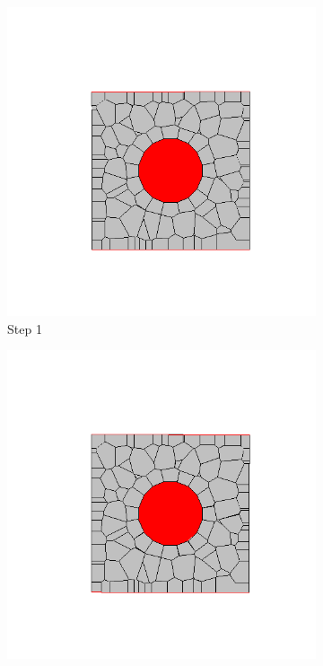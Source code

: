   \begin{figure}[ht!]
  \centering
      \begin{subfigure}{.25\textwidth}
        \centering
        \includegraphics[width=1.0\linewidth]{Files/Small_ASR/CR/DEP5-STEP(001).png}
      \caption{Step 1}
      \end{subfigure}%
      \begin{subfigure}{.25\textwidth}
        \centering
        \includegraphics[width=1.0\linewidth]{Files/Small_ASR/CR/DEP5-STEP(002).png}

\end{subfigure}
\end{figure}

